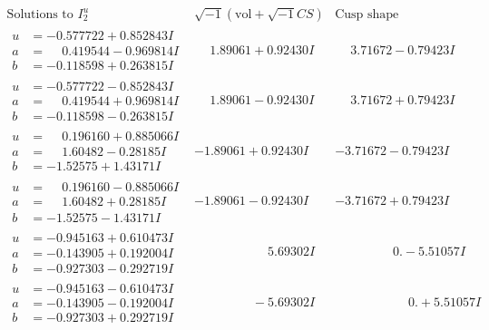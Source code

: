 \documentclass[1p]{elsarticle_modified}
\theoremstyle{definition}
\newcommand{\I}{\sqrt{-1}}
\begin{document}
$$\begin{array}{c|c|c}  
\text{Solutions to }I^u_{2}& \I (\text{vol} + \sqrt{-1}CS) & \text{Cusp shape}\\
 \hline 
\begin{aligned}
u &= -0.577722 + 0.852843 I \\
a &= \phantom{-}0.419544 - 0.969814 I \\
b &= -0.118598 + 0.263815 I\end{aligned}
 & \phantom{-}1.89061 + 0.92430 I & \phantom{-}3.71672 - 0.79423 I \\ \hline\begin{aligned}
u &= -0.577722 - 0.852843 I \\
a &= \phantom{-}0.419544 + 0.969814 I \\
b &= -0.118598 - 0.263815 I\end{aligned}
 & \phantom{-}1.89061 - 0.92430 I & \phantom{-}3.71672 + 0.79423 I \\ \hline\begin{aligned}
u &= \phantom{-}0.196160 + 0.885066 I \\
a &= \phantom{-}1.60482 - 0.28185 I \\
b &= -1.52575 + 1.43171 I\end{aligned}
 & -1.89061 + 0.92430 I & -3.71672 - 0.79423 I \\ \hline\begin{aligned}
u &= \phantom{-}0.196160 - 0.885066 I \\
a &= \phantom{-}1.60482 + 0.28185 I \\
b &= -1.52575 - 1.43171 I\end{aligned}
 & -1.89061 - 0.92430 I & -3.71672 + 0.79423 I \\ \hline\begin{aligned}
u &= -0.945163 + 0.610473 I \\
a &= -0.143905 + 0.192004 I \\
b &= -0.927303 - 0.292719 I\end{aligned}
 & \phantom{-0.000000 -}5.69302 I & \phantom{-0.000000 } 0. - 5.51057 I \\ \hline\begin{aligned}
u &= -0.945163 - 0.610473 I \\
a &= -0.143905 - 0.192004 I \\
b &= -0.927303 + 0.292719 I\end{aligned}
 & \phantom{-0.000000 } -5.69302 I & \phantom{-0.000000 -}0. + 5.51057 I \\ \hline\begin{aligned}

\end{aligned}
\end{array}$$
\end{document}
